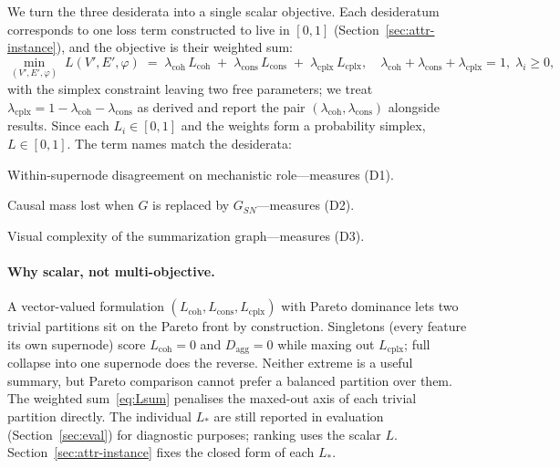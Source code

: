 We turn the three desiderata into a single scalar objective. Each
desideratum corresponds to one loss term constructed to live in
$[0, 1]$ (Section~\ref{sec:attr-instance}), and the objective is their
weighted sum:
\begin{equation}
\min_{(V', E', \varphi)}\;
L(V', E', \varphi)
\;=\;
\lambda_{\text{coh}}\, L_{\text{coh}}
\;+\;
\lambda_{\text{cons}}\, L_{\text{cons}}
\;+\;
\lambda_{\text{cplx}}\, L_{\text{cplx}},
\quad
\lambda_{\text{coh}} + \lambda_{\text{cons}} + \lambda_{\text{cplx}} = 1,\;
\lambda_i \ge 0,
\label{eq:Lsum}
\end{equation}
with the simplex constraint leaving two free parameters;
we treat $\lambda_{\text{cplx}} = 1 - \lambda_{\text{coh}} -
\lambda_{\text{cons}}$ as derived and report the pair
$(\lambda_{\text{coh}}, \lambda_{\text{cons}})$ alongside results.
Since each $L_i \in [0,1]$ and the weights form a probability simplex,
$L \in [0, 1]$. The term names match the desiderata:
\begin{description}[leftmargin=2.0em,style=nextline,topsep=2pt,itemsep=2pt]
\item[$L_{\text{coh}}(\varphi;\, V', E')$.] Within-supernode disagreement
on mechanistic role---measures (D1).
\item[$L_{\text{cons}}(V', E', \varphi;\, G)$.] Causal mass lost when
$G$ is replaced by $G_{SN}$---measures (D2).
\item[$L_{\text{cplx}}(V', E', \varphi)$.] Visual complexity of the
summarization graph---measures (D3).
\end{description}

\paragraph{Why scalar, not multi-objective.}
A vector-valued formulation $(L_{\text{coh}}, L_{\text{cons}},
L_{\text{cplx}})$ with Pareto dominance lets two trivial partitions sit
on the Pareto front by construction. Singletons (every feature its own
supernode) score $L_{\text{coh}} = 0$ and $D_{\text{agg}} = 0$ while
maxing out $L_{\text{cplx}}$; full collapse into one supernode does the
reverse. Neither extreme is a useful summary, but Pareto comparison
cannot prefer a balanced partition over them. The weighted
sum~\eqref{eq:Lsum} penalises the maxed-out axis of each trivial
partition directly. The individual $L_\ast$ are still reported in
evaluation (Section~\ref{sec:eval}) for diagnostic purposes; ranking
uses the scalar $L$. Section~\ref{sec:attr-instance} fixes the closed
form of each $L_\ast$.

